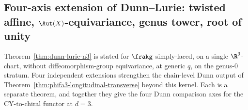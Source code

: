 \subsection{Four-axis extension of Dunn--Lurie: twisted affine, \texorpdfstring{$\Aut(X)$}{Aut(X)}-equivariance, genus tower, root of unity}
\label{subsec:dunn-four-axis-extension}

Theorem~\ref{thm:dunn-lurie-n3} is stated for $\frakg$ simply-laced, on a single $\R^3$-chart, without diffeomorphism-group equivariance, at generic $q$, on the genus-$0$ stratum. Four independent extensions strengthen the chain-level Dunn output of Theorem~\ref{thm:phifa3-longitudinal-transverse} beyond this kernel. Each is a separate theorem, and together they give the four Dunn comparison axes for the CY-to-chiral functor at $d = 3$.

\providecommand{\Assoc}{\mathrm{Assoc}}
\providecommand{\GRT}{\mathrm{GRT}}
\providecommand{\Kmat}{K}

